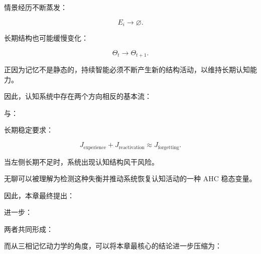 情景经历不断蒸发：

\[
E_i\rightarrow\varnothing.
\]

长期结构也可能缓慢变化：

\[
\Theta_t\rightarrow\Theta_{t+1}.
\]

正因为记忆不是静态的，持续智能必须不断产生新的结构活动，以维持长期认知能力。

因此，认知系统中存在两个方向相反的基本流：

\begin{statementbox}
\centering
{}
\end{statementbox}

与：

\begin{statementbox}
\centering
{}
\end{statementbox}

长期稳定要求：

\[
\boxed{
J_{\mathrm{experience}}
+
J_{\mathrm{reactivation}}
\approx
J_{\mathrm{forgetting}}.
}
\]

当左侧长期不足时，系统出现认知结构风干风险。

无聊可以被理解为检测这种失衡并推动系统恢复认知活动的一种 AHC 稳态变量。

因此，本章最终提出：

\begin{statementbox}
\centering
{}
\end{statementbox}

进一步：

\begin{statementbox}
\centering
{}
\end{statementbox}

两者共同形成：

\begin{statementbox}
\centering
{}
\end{statementbox}

而从三相记忆动力学的角度，可以将本章最核心的结论进一步压缩为：

\begin{statementbox}
\centering
{}
\end{statementbox}